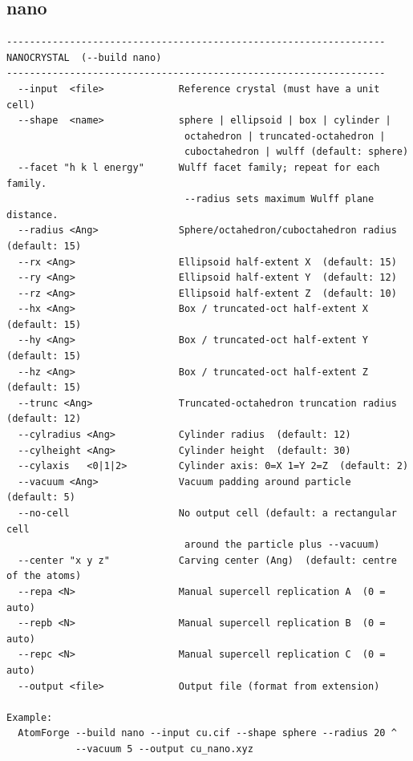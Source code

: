 \clearpage

\subsection{nano}

\begin{lstlisting}
------------------------------------------------------------------
NANOCRYSTAL  (--build nano)
------------------------------------------------------------------
  --input  <file>             Reference crystal (must have a unit cell)
  --shape  <name>             sphere | ellipsoid | box | cylinder |
                               octahedron | truncated-octahedron |
                               cuboctahedron | wulff (default: sphere)
  --facet "h k l energy"      Wulff facet family; repeat for each family.
                               --radius sets maximum Wulff plane distance.
  --radius <Ang>              Sphere/octahedron/cuboctahedron radius (default: 15)
  --rx <Ang>                  Ellipsoid half-extent X  (default: 15)
  --ry <Ang>                  Ellipsoid half-extent Y  (default: 12)
  --rz <Ang>                  Ellipsoid half-extent Z  (default: 10)
  --hx <Ang>                  Box / truncated-oct half-extent X  (default: 15)
  --hy <Ang>                  Box / truncated-oct half-extent Y  (default: 15)
  --hz <Ang>                  Box / truncated-oct half-extent Z  (default: 15)
  --trunc <Ang>               Truncated-octahedron truncation radius  (default: 12)
  --cylradius <Ang>           Cylinder radius  (default: 12)
  --cylheight <Ang>           Cylinder height  (default: 30)
  --cylaxis   <0|1|2>         Cylinder axis: 0=X 1=Y 2=Z  (default: 2)
  --vacuum <Ang>              Vacuum padding around particle  (default: 5)
  --no-cell                   No output cell (default: a rectangular cell
                               around the particle plus --vacuum)
  --center "x y z"            Carving center (Ang)  (default: centre of the atoms)
  --repa <N>                  Manual supercell replication A  (0 = auto)
  --repb <N>                  Manual supercell replication B  (0 = auto)
  --repc <N>                  Manual supercell replication C  (0 = auto)
  --output <file>             Output file (format from extension)

Example:
  AtomForge --build nano --input cu.cif --shape sphere --radius 20 ^
            --vacuum 5 --output cu_nano.xyz
\end{lstlisting}

\clearpage


